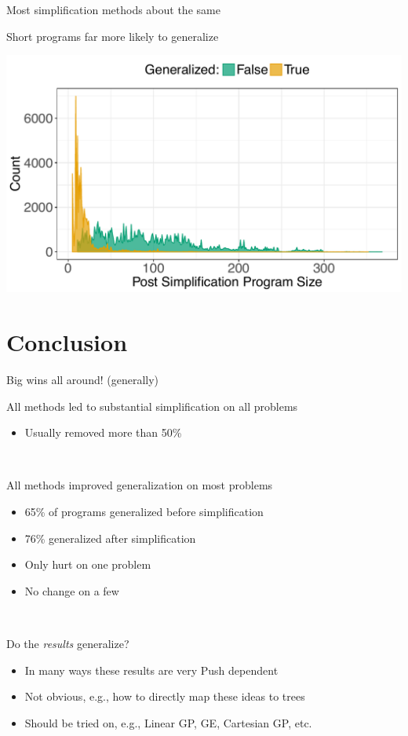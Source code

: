\documentclass{beamer}
\begin{document}
\begin{frame}{Most simplification methods about the same}
\end{frame}

\begin{frame}{Short programs far more likely to generalize}
\begin{center}
	\includegraphics[width=0.9\linewidth]{Illustrations/Size_Density_final}
\end{center}

\end{frame}

\section{Conclusion}

\begin{frame}{Big wins all around! (generally)}

All methods led to substantial simplification on all problems
\begin{itemize}
	\item Usually removed more than 50\%
\end{itemize}

~

All methods improved generalization on most problems
\begin{itemize}
	\item 65\% of programs generalized before simplification
	\item 76\% generalized after simplification
	\item Only hurt on one problem
	\item No change on a few
\end{itemize}

~

Do the \emph{results} generalize?
\begin{itemize}
	\item In many ways these results are very Push dependent
	\item Not obvious, e.g., how to directly map these ideas to trees
	\item Should be tried on, e.g., Linear GP, GE, Cartesian GP, etc.
\end{itemize}


\end{frame}
\end{document}
